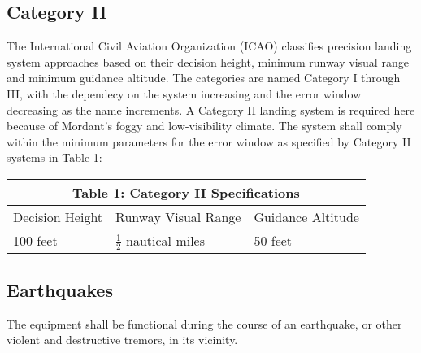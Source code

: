 \documentclass[11pt]{article}
\begin{document}
		\subsection{Category II}
		The International Civil Aviation Organization (ICAO) classifies precision landing system approaches based on their decision height, minimum runway visual range and minimum guidance altitude. The categories are named Category I through III, with the dependecy on the system increasing and the error window decreasing as the name increments. A Category II landing system is required here because of Mordant's foggy and low-visibility climate. The system shall comply within the minimum parameters for the error window as specified by Category II systems in Table 1:

		\renewcommand{\arraystretch}{1.5}
		\setlength{\tabcolsep}{18pt}
		\begin{table}[h!]
			\centering
			\begin{tabular}{|p{5cm}|p{5cm}|p{5cm}|}
				 \hline
				 \multicolumn{3}{|c|}{Table 1: Category II Specifications} \\
				 \hline
				 Decision Height & Runway Visual Range & Guidance Altitude\\
				 \hline
				 100 feet & $\frac{1}{2}$ nautical miles & 50 feet\\
				 \hline
			\end{tabular}
		\end{table}

		\subsection{Earthquakes}
		The equipment shall be functional during the course of an earthquake, or other violent and destructive tremors, in its vicinity.
\end{document}
